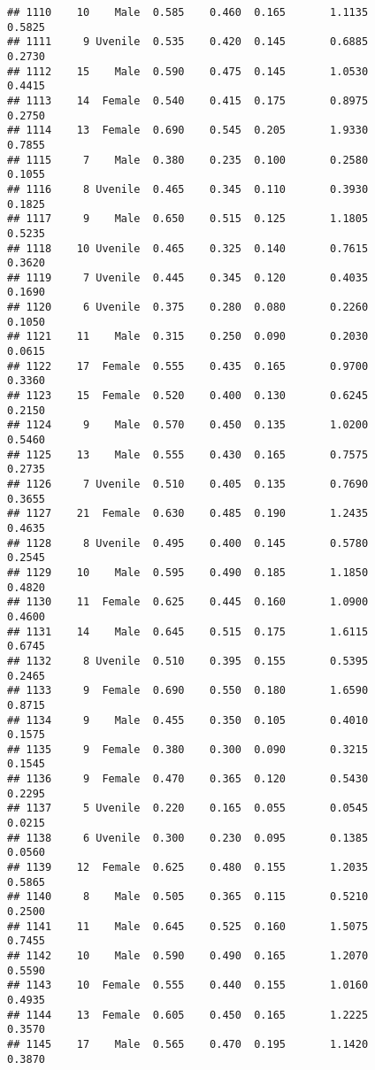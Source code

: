 \documentclass[
]{article}
\begin{document}
\begin{verbatim}
## 1110    10    Male  0.585    0.460  0.165       1.1135         0.5825
## 1111     9 Uvenile  0.535    0.420  0.145       0.6885         0.2730
## 1112    15    Male  0.590    0.475  0.145       1.0530         0.4415
## 1113    14  Female  0.540    0.415  0.175       0.8975         0.2750
## 1114    13  Female  0.690    0.545  0.205       1.9330         0.7855
## 1115     7    Male  0.380    0.235  0.100       0.2580         0.1055
## 1116     8 Uvenile  0.465    0.345  0.110       0.3930         0.1825
## 1117     9    Male  0.650    0.515  0.125       1.1805         0.5235
## 1118    10 Uvenile  0.465    0.325  0.140       0.7615         0.3620
## 1119     7 Uvenile  0.445    0.345  0.120       0.4035         0.1690
## 1120     6 Uvenile  0.375    0.280  0.080       0.2260         0.1050
## 1121    11    Male  0.315    0.250  0.090       0.2030         0.0615
## 1122    17  Female  0.555    0.435  0.165       0.9700         0.3360
## 1123    15  Female  0.520    0.400  0.130       0.6245         0.2150
## 1124     9    Male  0.570    0.450  0.135       1.0200         0.5460
## 1125    13    Male  0.555    0.430  0.165       0.7575         0.2735
## 1126     7 Uvenile  0.510    0.405  0.135       0.7690         0.3655
## 1127    21  Female  0.630    0.485  0.190       1.2435         0.4635
## 1128     8 Uvenile  0.495    0.400  0.145       0.5780         0.2545
## 1129    10    Male  0.595    0.490  0.185       1.1850         0.4820
## 1130    11  Female  0.625    0.445  0.160       1.0900         0.4600
## 1131    14    Male  0.645    0.515  0.175       1.6115         0.6745
## 1132     8 Uvenile  0.510    0.395  0.155       0.5395         0.2465
## 1133     9  Female  0.690    0.550  0.180       1.6590         0.8715
## 1134     9    Male  0.455    0.350  0.105       0.4010         0.1575
## 1135     9  Female  0.380    0.300  0.090       0.3215         0.1545
## 1136     9  Female  0.470    0.365  0.120       0.5430         0.2295
## 1137     5 Uvenile  0.220    0.165  0.055       0.0545         0.0215
## 1138     6 Uvenile  0.300    0.230  0.095       0.1385         0.0560
## 1139    12  Female  0.625    0.480  0.155       1.2035         0.5865
## 1140     8    Male  0.505    0.365  0.115       0.5210         0.2500
## 1141    11    Male  0.645    0.525  0.160       1.5075         0.7455
## 1142    10    Male  0.590    0.490  0.165       1.2070         0.5590
## 1143    10  Female  0.555    0.440  0.155       1.0160         0.4935
## 1144    13  Female  0.605    0.450  0.165       1.2225         0.3570
## 1145    17    Male  0.565    0.470  0.195       1.1420         0.3870

\end{verbatim}
\end{document}
